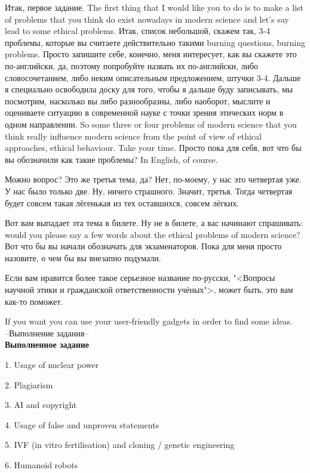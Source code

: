 \documentclass[main.tex]{subfiles}
\begin{document}
Итак, первое задание.
The first thing that I would like you to do is to make a list of problems that you think do exist nowadays in modern science and let's say lead to some ethical problems.
Итак, список небольшой, скажем так, 3-4 проблемы, которые вы считаете действительно такими burning questions, burning problems.
Просто запишите себе, конечно, меня интересует, как вы скажете это по-английски, да, поэтому попробуйте назвать их по-английски, либо словосочетанием, либо неким описательным предложением, штучки 3-4.
Дальше я специально освободила доску для того, чтобы я дальше буду записывать, мы посмотрим, насколько вы либо разнообразны, либо наоборот, мыслите и оцениваете ситуацию в современной науке с точки зрения этических норм в одном направлении.
So some three or four problems of modern science that you think really influence modern science from the point of view of ethical approaches, ethical behaviour.
Take your time.
Просто пока для себя, вот что бы вы обозначили как такие проблемы?
In English, of course.

Можно вопрос? Это же третья тема, да? Нет, по-моему, у нас это четвертая уже.
У нас было только две.
Ну, ничего страшного.
Значит, третья.
Тогда четвертая будет совсем такая лёгенькая из тех оставшихся, совсем лёгких.

Вот вам выпадает эта тема в билете.
Ну не в билете, а вас начинают спрашивать: would you please say a few words about the ethical problems of modern science?
Вот что бы вы начали обозначать для экзаменаторов.
Пока для меня просто назовите, о чем бы вы внезапно подумали.

Если вам нравится более такое серьезное название по-русски, "<Вопросы научной этики и гражданской ответственности учёных">, может быть, это вам как-то поможет.

If you want you can use your user-friendly gadgets in order to find some ideas.
\\

--Выполнение задания--
\\

\textbf{Выполненное задание}

1. Usage of nuclear power

2. Plagiarism

3. AI and copyright

4. Usage of false and unproven statements

5. IVF (in vitro fertilisation) and cloning / genetic engineering

6. Humanoid robots
\end{document}
